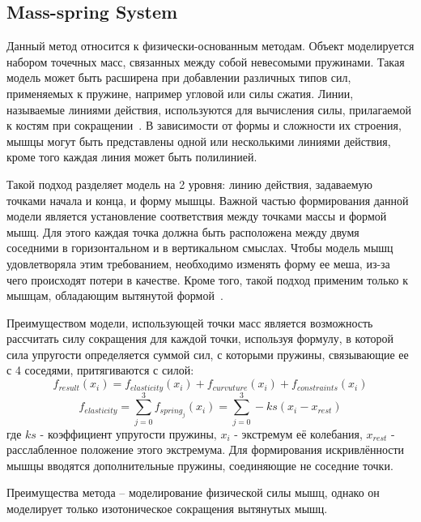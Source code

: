 \subsection{Mass-spring System}
\label{subsec:MSS}
Данный метод относится к физически-основанным методам. Объект моделируется набором точечных масс, связанных между собой невесомыми пружинами. Такая модель может быть расширена при добавлении различных типов сил, применяемых к пружине, например угловой или силы сжатия. Линии, называемые линиями действия, используются для вычисления силы, прилагаемой к костям при сокращении~\cite{nedel}. В зависимости от формы и сложности их строения, мышцы могут быть представлены одной или несколькими линиями действия, кроме того каждая линия может быть полилинией.
\par Такой подход разделяет модель на 2 уровня: линию действия, задаваемую точками начала и конца, и форму мышцы. Важной частью формирования данной модели является установление соответствия между точками массы и формой мышц. Для этого каждая точка должна быть расположена между двумя соседними в горизонтальном и в вертикальном смыслах. Чтобы модель мышц удовлетворяла этим требованием, необходимо изменять форму ее меша, из-за чего происходят потери в качестве. Кроме того, такой подход применим только к мышцам, обладающим вытянутой формой~\cite{nedel}.
\par Преимуществом модели, использующей точки масс является возможность рассчитать силу сокращения для каждой точки, используя формулу, в которой сила упругости определяется суммой сил, с которыми пружины, связывающие ее с 4 соседями, притягиваются с силой:
\begin{equation}\label{mss_01}
f_{result}(x_{i})=f_{elasticity}(x_{i})+f_{curvuture}(x_{i})+f_{constraints}(x_{i})
\end{equation}
\begin{equation}\label{mss_02}
f_{elasticity}=\sum_{j=0}^{3}f_{spring_{j}}(x_{i})=\sum_{j=0}^{3}-ks(x_{i}-x_{rest})
\end{equation}
где $ks$ - коэффициент упругости пружины, $x_{i}$ - экстремум её колебания, $x_{rest}$ - расслабленное положение этого экстремума. Для формирования искривлённости мышцы вводятся дополнительные пружины, соединяющие не соседние точки.
\par Преимущества метода -- моделирование физической силы мышц, однако он моделирует только изотоническое сокращения вытянутых мышц.

